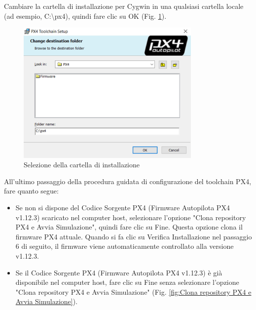\noindent
Cambiare la cartella di installazione per Cygwin in una qualsiasi cartella locale (ad esempio, C:\textbackslash{}px4), quindi fare clic su OK (Fig. \ref{fig:Selezione della cartella di installazione}).
\begin{figure}[H] %
  \centering
  \includegraphics[width=0.8\textwidth]{files/images/folder_name.png} %
  \caption{Selezione della cartella di installazione} %
  \label{fig:Selezione della cartella di installazione} %
\end{figure}
\noindent
All'ultimo passaggio della procedura guidata di configurazione del toolchain PX4, fare quanto segue:
\begin{itemize}
    \item Se non si dispone del Codice Sorgente PX4 (Firmware Autopilota PX4 v1.12.3) scaricato nel computer host, selezionare l'opzione "Clona repository PX4 e Avvia Simulazione", quindi fare clic su Fine. Questa opzione clona il firmware PX4 attuale. Quando si fa clic su Verifica Installazione nel passaggio 6 di seguito, il firmware viene automaticamente controllato alla versione v1.12.3.
    \item Se il Codice Sorgente PX4 (Firmware Autopilota PX4 v1.12.3) è già disponibile nel computer host, fare clic su Fine senza selezionare l'opzione "Clona repository PX4 e Avvia Simulazione" (Fig. \ref{fig:Clona repository PX4 e Avvia Simulazione}).
\end{itemize}

